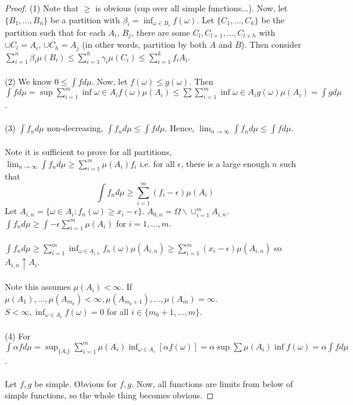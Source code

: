 \documentclass[12pt]{article}
\begin{document}
\begin{proof}
(1) Note that $\ge$ is obvious (sup over all simple functions...).  Now, let $\{B_1, ..., B_n\}$ be a partition with $\beta_i = \inf_{\omega \in B_i} f (\omega)$.  Let $\{C_1, ..., C_k\}$ be the partition such that for each $A_i$, $B_j$, there are some $C_l, C_{l+1}, ..., C_{l+h}$ with $\cup C_l = A_i$, $\cup C_h = A_j$ (in other words, partition by both $A$ and $B$).  Then consider $\sum_{i=1}^n \beta_i \mu(B_i) \le \sum_{i=1}^h \gamma_i \mu(C_i) \le \sum_{i=1}^k f_i A_i$.
\\ \\
(2) We know $0 \le \int f d \mu$.  Now, let $f(\omega) \le g(\omega)$.  Then $\int f d \mu = \sup \sum_{i=1}^m \inf \omega \in A_i f (\omega) \mu(A_i) \le \sum \sum_{i=1}^m \inf \omega \in A_i g(\omega) \mu(A_i) = \int g d \mu$.
\\ \\
(3) $\int f_n d \mu$ non-decreasing, $\int f_n d \mu \le \int f d \mu$.  Hence, $\lim_{n \to \infty} \int f_n d \mu \le \int f d \mu$.
\\ \\
Note it is sufficient to prove for all partitions, $\lim_{n \to \infty} \int f_n d \mu \ge \sum_{i=1}^m \mu(A_i) f_i$ i.e. for all $\epsilon$, there is a large enough $n$ such that
$$\int f_n d \mu \ge \sum_{i=1}^m (f_i - \epsilon) \mu(A_i)$$
Let $A_{i, n} = \{ \omega \in A_i : f_n(\omega) \ge x_i - \epsilon \}$.  $A_{0, n} = \Omega \backslash \cup_{i=1}^m A_{i, n}$.  $\int f_n d \mu \ge \int - \epsilon \sum_{i=1}^m \mu(A_i)$ for $i = 1, ..., m$.
\\ \\
$\int f_n d \mu \ge \sum_{i=1}^m \inf_{\omega \in A_{i, n}} f_n(\omega) \mu(A_{i, n}) \ge \sum_{i=1}^m (x_i - \epsilon) \mu(A_{i,n})$ so $A_{i, n} \uparrow A_i$.
\\ \\
Note this assumes $\mu(A_i) < \infty$.  If $\mu(A_1), ..., \mu(A_{m_0}) < \infty, \mu(A_{m_0 + 1}), ..., \mu(A_m) = \infty$.  $S < \infty, \inf_{\omega \in A_i} f(\omega) = 0$ for all $i \in \{m_0 + 1, ..., m\}$.
\\ \\
(4) For $\int \alpha f d \mu = \sup_{\{A_i\}} \sum_{i=1}^m \mu(A_i) \inf_{\omega \in A_i} [ \alpha f(\omega) ] = \alpha \sup \sum \mu(A_i) \inf f(\omega) = \alpha \int f d \mu$.
\\ \\
Let $f, g$ be simple.  Obvious for $f, g$.  Now, all functions are limits from below of simple functions, so the whole thing becomes obvious.

\end{proof}
\end{document}
